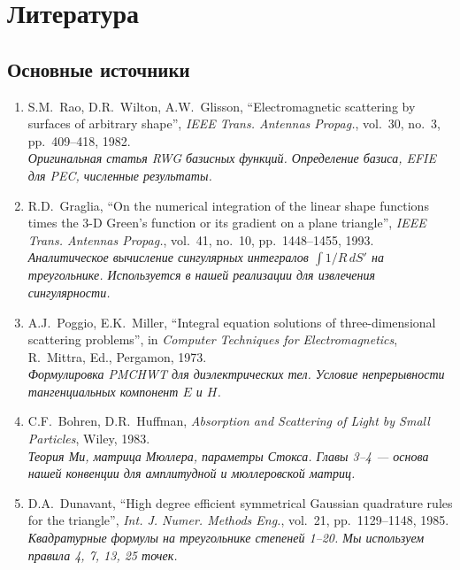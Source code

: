 \documentclass[12pt,a4paper]{article}
\begin{document}
\section{Литература}

\subsection{Основные источники}

\begin{enumerate}
  \item S.M.~Rao, D.R.~Wilton, A.W.~Glisson, ``Electromagnetic scattering by surfaces of arbitrary shape'', \textit{IEEE Trans. Antennas Propag.}, vol.~30, no.~3, pp.~409--418, 1982.
  \\ \textit{Оригинальная статья RWG базисных функций. Определение базиса, EFIE для PEC, численные результаты.}

  \item R.D.~Graglia, ``On the numerical integration of the linear shape functions times the 3-D Green's function or its gradient on a plane triangle'', \textit{IEEE Trans. Antennas Propag.}, vol.~41, no.~10, pp.~1448--1455, 1993.
  \\ \textit{Аналитическое вычисление сингулярных интегралов $\int 1/R\,dS'$ на треугольнике. Используется в нашей реализации для извлечения сингулярности.}

  \item A.J.~Poggio, E.K.~Miller, ``Integral equation solutions of three-dimensional scattering problems'', in \textit{Computer Techniques for Electromagnetics}, R.~Mittra, Ed., Pergamon, 1973.
  \\ \textit{Формулировка PMCHWT для диэлектрических тел. Условие непрерывности тангенциальных компонент $E$ и $H$.}

  \item C.F.~Bohren, D.R.~Huffman, \textit{Absorption and Scattering of Light by Small Particles}, Wiley, 1983.
  \\ \textit{Теория Ми, матрица Мюллера, параметры Стокса. Главы 3--4 --- основа нашей конвенции для амплитудной и мюллеровской матриц.}

  \item D.A.~Dunavant, ``High degree efficient symmetrical Gaussian quadrature rules for the triangle'', \textit{Int. J. Numer. Methods Eng.}, vol.~21, pp.~1129--1148, 1985.
  \\ \textit{Квадратурные формулы на треугольнике степеней 1--20. Мы используем правила 4, 7, 13, 25 точек.}


\end{enumerate}
\end{document}
